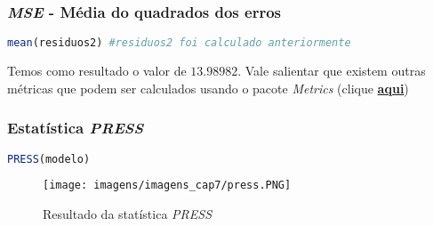 \subsubsection{\textit{MSE} - Média do quadrados dos erros}


\begin{lstlisting}[language=R, caption = {MSE},label={lst:code23}]
mean(residuos2) #residuos2 foi calculado anteriormente
\end{lstlisting}

\noindent Temos como resultado o valor de $13.98982$. Vale salientar que existem outras métricas que podem ser calculados usando o pacote \textit{Metrics} (clique \href{https://cran.r-project.org/web/packages/Metrics/Metrics.pdf}{\textbf{aqui}})

\subsubsection{Estatística \textit{PRESS}}

\begin{lstlisting}[language=R, caption = {Estatística \textit{PRESS}},label={lst:code24}]
PRESS(modelo)
\end{lstlisting}

\begin{figure}[H]
\centering
\caption{Resultado da statística \textit{PRESS}}
\texttt{[image: imagens/imagens\_cap7/press.PNG]}
\label{fig:press}
\end{figure}










